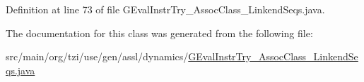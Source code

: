 Definition at line 73 of file G\-Eval\-Instr\-Try\-\_\-\-Assoc\-Class\-\_\-\-Linkend\-Seqs.\-java.



The documentation for this class was generated from the following file\-:\begin{DoxyCompactItemize}
\item 
src/main/org/tzi/use/gen/assl/dynamics/\hyperlink{_g_eval_instr_try___assoc_class___linkend_seqs_8java}{G\-Eval\-Instr\-Try\-\_\-\-Assoc\-Class\-\_\-\-Linkend\-Seqs.\-java}\end{DoxyCompactItemize}
